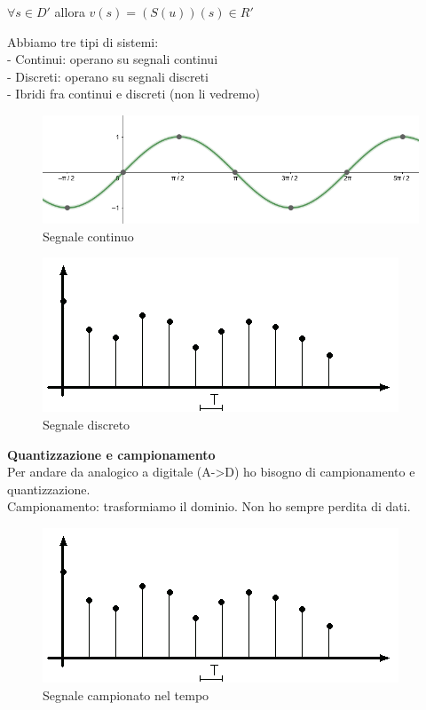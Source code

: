 $ \forall s \in D' $ allora $ v(s)=(S(u))(s)\in R'  $ \\

\pagebreak

Abbiamo tre tipi di sistemi:\\
- Continui: operano su segnali continui\\
- Discreti: operano su segnali discreti\\
- Ibridi fra continui e discreti (non li vedremo)\\

\begin{figure}[h]
	\centering
	\includegraphics[width=0.7\linewidth]{immagini/seno}
	\caption{Segnale continuo}
	\label{fig:seno}
\end{figure}


\begin{figure}[h]
	\centering
	\includegraphics[width=0.7\linewidth]{immagini/tempo_discreto}
	\caption{ Segnale discreto}
	\label{fig:tempodiscreto}
\end{figure}

\textbf{Quantizzazione e campionamento}\\
Per andare da analogico a digitale (A->D) ho bisogno di campionamento e quantizzazione.\\

Campionamento: trasformiamo il dominio. Non ho sempre perdita di dati.\\

\begin{figure}[h]
	\centering
	\includegraphics[width=0.7\linewidth]{immagini/tempo_discreto}
	\caption{ Segnale campionato nel tempo}
	\label{fig:tempodiscreto}
\end{figure}

